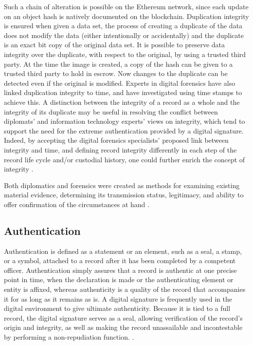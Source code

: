 Such a chain of alteration is possible on the Ethereum network, since each update on an object hash is natively documented on the blockchain.
Duplication integrity is ensured when given a data set, the process of creating a duplicate of the data does not modify the data (either intentionally or accidentally) and the duplicate is an exact bit copy of the original data set. It is possible to preserve data integrity over the duplicate, with respect to the original, by using a trusted third party. At the time the image is created, a copy of the hash can be given to a trusted third party to hold in escrow. Now changes to the duplicate can be detected even if the original is modified.\newline
Experts in digital forensics have also linked duplication integrity to time, and have investigated using time stamps to achieve this. A distinction between the integrity of a record as a whole and the integrity of its duplicate may be useful in resolving the conflict between diplomats' and information technology experts' views on integrity, which tend to support the need for the extreme authentication provided by a digital signature. Indeed, by accepting the digital forensics specialists' proposed link between integrity and time, and defining record integrity differently in each step of the record life cycle and/or custodial history, one could further enrich the concept of integrity \cite[60]{duranti2009digital}.

Both diplomatics and forensics were created as methods for examining existing material evidence, determining its transmission status, legitimacy, and ability to offer confirmation of the circumstances at hand \cite[64]{duranti2009digital}.

\subsection{Authentication}
Authentication is defined as a statement or an element, such as a seal, a stamp, or a symbol, attached to a record after it has been completed by a competent officer. Authentication simply assures that a record is authentic at one precise point in time, when the declaration is made or the authenticating element or entity is affixed, whereas authenticity is a quality of the record that accompanies it for as long as it remains as is. A digital signature is frequently used in the digital environment to give ultimate authenticity. Because it is tied to a full record, the digital signature serves as a seal, allowing verification of the record's origin and integrity, as well as making the record unassailable and incontestable by performing a non-repudiation function. \cite[53]{duranti2009digital}.


